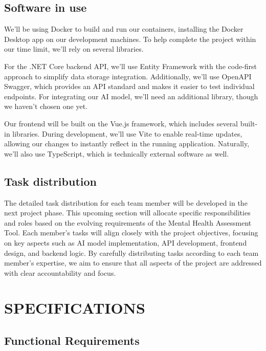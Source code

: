 \documentclass[conference]{IEEEtran}
\begin{document}
    \subsection {Software in use}

We'll be using Docker to build and run our containers, installing the 
Docker Desktop app on our development machines. To help complete the 
project within our time limit, we’ll rely on several libraries.
\newline

For the .NET Core backend API, we’ll use Entity Framework with the 
code-first approach to simplify data storage integration. Additionally, 
we’ll use OpenAPI Swagger, which provides an API standard and makes it 
easier to test individual endpoints. For integrating our AI model, we’ll 
need an additional library, though we haven’t chosen one yet.
\newline

Our frontend will be built on the Vue.js framework, which includes several 
built-in libraries. During development, we’ll use Vite to enable real-time 
updates, allowing our changes to instantly reflect in the running application. 
Naturally, we’ll also use TypeScript, which is technically external 
software as well.
\newline

    \subsection {Task distribution}

    The detailed task distribution for each team member will be 
    developed in the next project phase. This upcoming section 
    will allocate specific responsibilities and roles based 
    on the evolving requirements of the Mental Health Assessment 
    Tool. Each member’s tasks will align closely with the project 
    objectives, focusing on key aspects such as AI model 
    implementation, API development, frontend design, and backend 
    logic. By carefully distributing tasks according to each team 
    member’s expertise, we aim to ensure that all aspects of the 
    project are addressed with clear accountability and focus.
    \newline

    \section{SPECIFICATIONS}


    \subsection {Functional Requirements}
   
\end{document}
